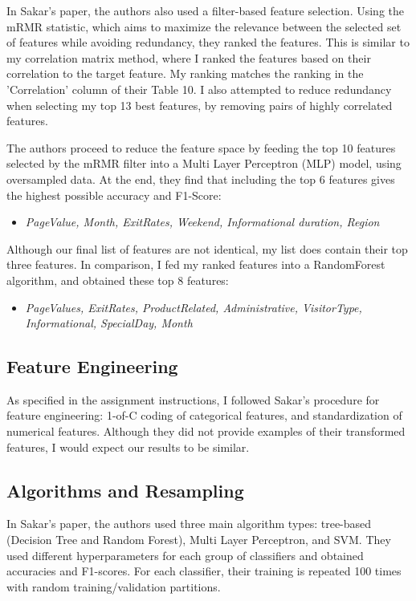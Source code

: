 \documentclass{article}
\begin{document}
In Sakar's paper, the authors also used a filter-based feature selection. Using the mRMR statistic, which aims to maximize the relevance between the selected set of features while avoiding redundancy, they ranked the features. This is similar to my correlation matrix method, where I ranked the features based on their correlation to the target feature. My ranking matches the ranking in the 'Correlation' column of their Table 10. I also attempted to reduce redundancy when selecting my top 13 best features, by removing pairs of highly correlated features.

The authors proceed to reduce the feature space by feeding the top 10 features selected by the mRMR filter into a Multi Layer Perceptron (MLP) model, using oversampled data. At the end, they find that including the top 6 features gives the highest possible accuracy and F1-Score:
\begin{itemize}
    \item \emph{PageValue, Month, ExitRates, Weekend, Informational duration, Region}
\end{itemize}

Although our final list of features are not identical, my list does contain their top three features. In comparison, I fed my ranked features into a RandomForest algorithm, and obtained these top 8 features:
\begin{itemize}
    \item \emph{PageValues, ExitRates, ProductRelated, Administrative, VisitorType, Informational, SpecialDay, Month}
\end{itemize}

\subsection{Feature Engineering}

As specified in the assignment instructions, I followed Sakar's procedure for feature engineering: 1-of-C coding of categorical features, and standardization of numerical features. Although they did not provide examples of their transformed features, I would expect our results to be similar.

\subsection{Algorithms and Resampling}

In Sakar's paper, the authors used three main algorithm types: tree-based (Decision Tree and Random Forest), Multi Layer Perceptron, and SVM. They used different hyperparameters for each group of classifiers and obtained accuracies and F1-scores. For each classifier, their training is repeated 100 times with random training/validation partitions.
\end{document}
